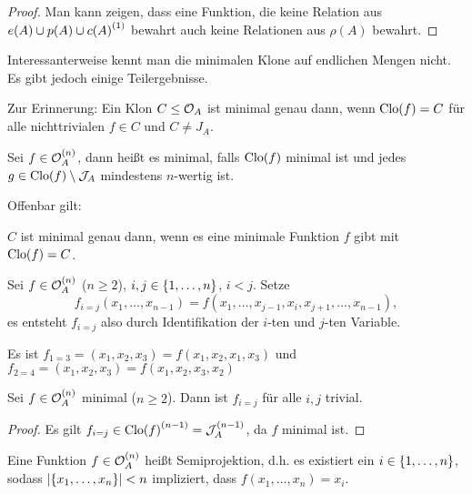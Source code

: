 \documentclass{book}
\begin{document}
\begin{proof}
    Man kann zeigen, dass eine Funktion, die keine Relation aus $e(A)\cup p(A)\cup{c(A)}^{(1)}$ bewahrt auch keine Relationen aus $\rho(A)$ bewahrt.
\end{proof}

Interessanterweise kennt man die minimalen Klone auf endlichen Mengen nicht. Es gibt jedoch einige Teilergebnisse.

Zur Erinnerung: Ein Klon $C\leq \mathcal{O}_A$ ist minimal genau dann, wenn $\mathrm{Clo}(f)=C$ für alle nichttrivialen $f\in C$ und $C\neq J_A$.

\begin{definition}
    Sei $f\in\mathcal{O}_A^{(n)}$, dann heißt es minimal, falls $\mathrm{Clo}(f)$ minimal ist und jedes $g\in\mathrm{Clo}(f)\setminus \mathcal{J}_A$ mindestens $n$-wertig ist.
\end{definition}

Offenbar gilt:

\begin{remark}
    $C$ ist minimal genau dann, wenn es eine minimale Funktion $f$ gibt mit $\mathrm{Clo}(f)=C$.
\end{remark}

\begin{definition}
    Sei $f\in\mathcal{O}_A^{(n)}$ ($n\geq 2$), $i,j\in \left\{1,\ldots,n\right\}$, $i<j$. Setze
    $$
    f_{i=j}(x_1,\ldots,x_{n-1})=f(x_1,\ldots,x_{j-1},x_i,x_{j+1},\ldots,x_{n-1}),
    $$
    es entsteht $f_{i=j}$ also durch Identifikation der $i$-ten und $j$-ten Variable.
\end{definition}

\begin{example}
    Es ist $f_{1=3}=(x_1,x_2,x_3)=f(x_1,x_2,x_1,x_3)$ und
    $f_{2=4}=(x_1,x_2,x_3)=f(x_1,x_2,x_3,x_2)$
\end{example}

\begin{proposition}
    Sei $f\in\mathcal{O}_A^{(n)}$ minimal ($n\geq 2$). Dann ist $f_{i=j}$ für alle $i,j$ trivial.
\end{proposition}

\begin{proof}
    Es gilt $f_{i=j}\in{\mathrm{Clo}(f)}^{(n-1)}=\mathcal{J}_A^{(n-1)}$, da $f$ minimal ist.
\end{proof}

\begin{definition}[Semiprojektion]
    Eine Funktion $f\in\mathcal{O}_A^{(n)}$ heißt Semiprojektion, d.h. es existiert ein $i\in\left\{1,\ldots,n\right\}$, sodass $\left|\left\{x_1,\ldots,x_n\right\}\right|<n$ impliziert, dass $f(x_1,\ldots,x_n)=x_i$.
\end{definition}
\end{document}

